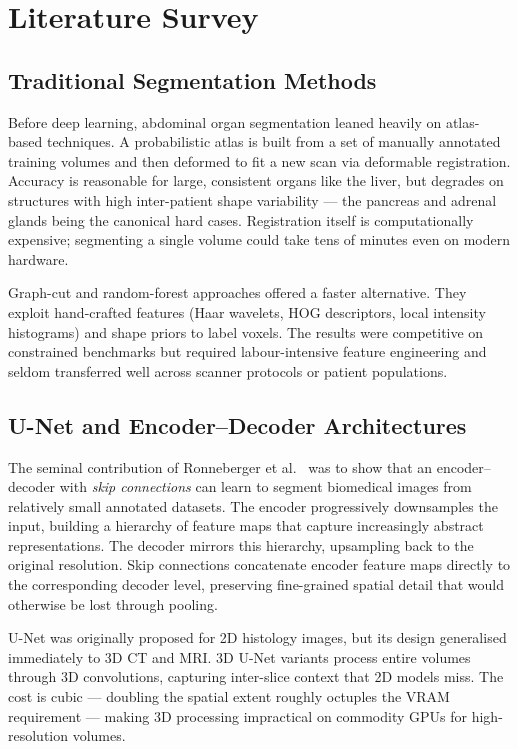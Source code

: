\chapter{Literature Survey}
\label{chap:lit}

\section{Traditional Segmentation Methods}

Before deep learning, abdominal organ segmentation leaned heavily on atlas-based techniques.
A probabilistic atlas is built from a set of manually annotated training volumes and then
deformed to fit a new scan via deformable registration. Accuracy is reasonable for large,
consistent organs like the liver, but degrades on structures with high inter-patient shape
variability --- the pancreas and adrenal glands being the canonical hard cases. Registration
itself is computationally expensive; segmenting a single volume could take tens of minutes
even on modern hardware.

Graph-cut and random-forest approaches offered a faster alternative. They exploit hand-crafted
features (Haar wavelets, HOG descriptors, local intensity histograms) and shape priors to label
voxels. The results were competitive on constrained benchmarks but required labour-intensive
feature engineering and seldom transferred well across scanner protocols or patient populations.

\section{U-Net and Encoder--Decoder Architectures}

The seminal contribution of Ronneberger et al.~\cite{ronneberger2015} was to show that an
encoder--decoder with \emph{skip connections} can learn to segment biomedical images from
relatively small annotated datasets. The encoder progressively downsamples the input, building
a hierarchy of feature maps that capture increasingly abstract representations. The decoder
mirrors this hierarchy, upsampling back to the original resolution. Skip connections concatenate
encoder feature maps directly to the corresponding decoder level, preserving fine-grained spatial
detail that would otherwise be lost through pooling.

U-Net was originally proposed for 2D histology images, but its design generalised
immediately to 3D CT and MRI. 3D U-Net variants process entire volumes through 3D convolutions,
capturing inter-slice context that 2D models miss. The cost is cubic --- doubling the
spatial extent roughly octuples the VRAM requirement --- making 3D processing impractical on
commodity GPUs for high-resolution volumes.


